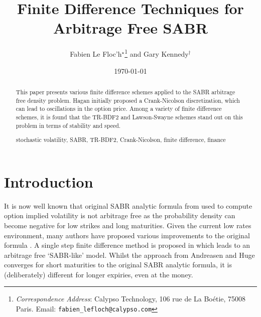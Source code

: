 \documentclass[]{rAMF2e}
\begin{document}
\doi{}
\issn{}  \issnp{}
\def\jobtag{}
\jname{}


\title{Finite Difference Techniques for Arbitrage Free SABR}
\author{Fabien {Le Floc'h}$^\star$\thanks{{\em{Correspondence Address}}: Calypso Technology, 106 rue de La Bo\'{e}tie, 75008 Paris. Email: \texttt{fabien\_lefloch@calypso.com} \vspace{6pt}} and Gary Kennedy$^\dag$}
%
\date{\today}

\maketitle
\newcommand{\sgn}{\mathop{\mathrm{sgn}}}
\begin{abstract}
This paper presents various finite difference schemes applied to the SABR arbitrage free density problem. Hagan initially proposed a Crank-Nicolson discretization, which can lead to oscillations in the option price. Among a variety of finite difference schemes, it is found that the TR-BDF2 and Lawson-Swayne schemes stand out on this problem in terms of stability and speed.
\begin{keywords}stochastic volatility, SABR, TR-BDF2, Crank-Nicolson, finite difference, finance\end{keywords}
\end{abstract}

\section{Introduction}
It is now well known that original SABR analytic formula from \citep{hagan2002managing} used to compute option implied volatility is not arbitrage free as the probability density can become negative for low strikes and long maturities. Given the current low rates environment, many authors have proposed various improvements to the original formula \citep{obloj2008fine, johnson2009arbitrage, paulot2009asymptotic, benaim2008arbitrage}.  A single step finite difference method is proposed in \citep{andreasen2011zabr} which leads to an arbitrage free `SABR-like' model. Whilst the approach from Andreasen and Huge converges for short maturities to the original SABR analytic formula, it is (deliberately) different for longer expiries, even at the money.
\end{document}

